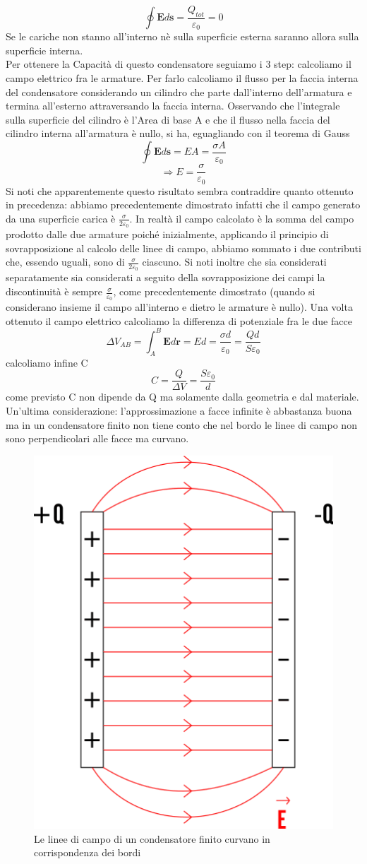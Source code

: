 \documentclass[
10pt, %
a4paper, %
oneside, %
headinclude,footinclude, %
BCOR5mm, %
]{scrartcl}
\begin{document}
\[\oint \mathbf{E}d\mathbf{s}= \frac{Q_{tot}}{\varepsilon_0}=0\]
Se le cariche non stanno all'interno nè sulla superficie esterna saranno allora sulla superficie interna.\\
Per ottenere la Capacità di questo condensatore seguiamo i 3 step: calcoliamo il campo elettrico fra le armature.
Per farlo calcoliamo il flusso per la faccia interna del condensatore considerando un cilindro che parte dall'interno dell'armatura e termina all'esterno attraversando la faccia interna. Osservando che l'integrale sulla superficie del cilindro è l'Area di base A e che il flusso nella faccia del cilindro interna all'armatura è nullo, si ha, eguagliando con il teorema di Gauss
\[\oint\mathbf{E}d\mathbf{s} = EA = \frac{\sigma A}{\varepsilon_0}\]
\[\Rightarrow E = \frac{\sigma}{\varepsilon_0}\]
Si noti che apparentemente questo risultato sembra contraddire quanto ottenuto in precedenza: abbiamo precedentemente dimostrato infatti che il campo generato da una superficie carica è $\frac{\sigma}{2\varepsilon_0}$. In realtà il campo calcolato è la somma del campo prodotto dalle due armature poiché inizialmente, applicando il principio di sovrapposizione al calcolo delle linee di campo, abbiamo sommato i due contributi che, essendo uguali, sono di $\frac{\sigma}{2\varepsilon_0}$ ciascuno. Si noti inoltre che sia considerati separatamente sia considerati a seguito della sovrapposizione dei campi la discontinuità è sempre $\frac{\sigma}{\varepsilon_0}$, come precedentemente dimostrato (quando si considerano insieme il campo all'interno e dietro le armature è nullo).
Una volta ottenuto il campo elettrico calcoliamo la differenza di potenziale fra le due facce 
\[\Delta V_{AB} = \int_{A}^{B}\mathbf{E}d\mathbf{r} = Ed=\frac{\sigma d}{\varepsilon_0}=\frac{Q d}{S\varepsilon_0}\]
calcoliamo infine C
\[C = \frac{Q}{\Delta V} = \frac{S\varepsilon_0}{d}\]
come previsto C non dipende da Q ma solamente dalla geometria e dal materiale.\\
Un'ultima considerazione: l'approssimazione a facce infinite è abbastanza buona ma in un condensatore finito non tiene conto che nel bordo le linee di campo non sono perpendicolari alle facce ma curvano. 
\begin{figure}[h!]
	\centering
	\includegraphics[width=0.4\linewidth]{../images/condensatore-piano-2}
	\caption{Le linee di campo di un condensatore finito curvano in corrispondenza dei bordi}
	\label{fig:condensatore-piano-2}
\end{figure}
\FloatBarrier
\end{document}
